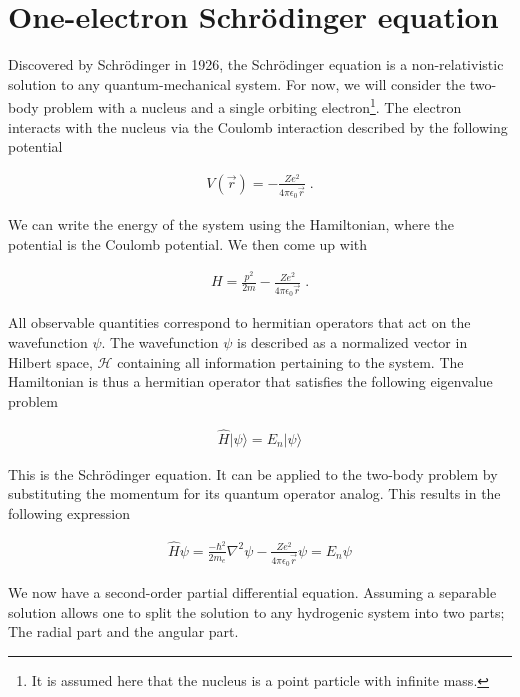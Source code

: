     \section{One-electron Schrödinger equation} \label{sec:Schrodinger_Equation}
        Discovered by Schrödinger in 1926, the Schrödinger equation is a non-relativistic solution to any quantum-mechanical system. For now, we will consider the two-body problem with a nucleus and a single orbiting electron\footnote{It is assumed here that the nucleus is a point particle with infinite mass.}. The electron interacts with the nucleus via the Coulomb interaction described by the following potential

        \begin{align}
            V(\vec{r}) = -\frac{Z e^2}{4\pi \epsilon_0 \vec{r}}\;.
        \end{align}

        \noindent We can write the energy of the system using the Hamiltonian, where the potential is the Coulomb potential. We then come up with 

        \begin{align}
            H = \frac{p^2}{2m} -\frac{Z e^2}{4\pi \epsilon_0 \vec{r}}\;.
        \end{align}

        \noindent All observable quantities correspond to hermitian operators that act on the wavefunction $\psi$. The wavefunction $\psi$ is described as a normalized vector in Hilbert space, $\mathcal{H}$ containing all information pertaining to the system. The Hamiltonian is thus a hermitian operator that satisfies the following eigenvalue problem 

        \begin{align}
            \hat{H} \vert\psi \rangle = E_n \vert \psi \rangle
        \end{align}

        This is the Schrödinger equation. It can be applied to the two-body problem by substituting the momentum for its quantum operator analog. This results in the following expression 

        \begin{align}
            \hat{H} \psi  = \frac{-\hbar^2}{2m_e} \nabla^2 \psi -\frac{Z e^2}{4\pi \epsilon_0 \vec{r}} \psi = E_n \psi 
        \end{align}

        We now have a second-order partial differential equation. Assuming a separable solution allows one to split the solution to any hydrogenic system into two parts; The radial part and the angular part.


